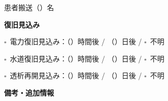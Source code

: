 \documentclass[a4paper,12pt]{jarticle}
\newcommand{\checkbox}{$\square$\ }
\newcommand{\underlinespace}[1]{\underline{\hspace{#1}}}
\begin{document}
\hspace*{3.5cm}患者搬送（\underlinespace{2cm}）名

\vspace{8mm}

\begin{center}
\textbf{\large 復旧見込み}
\end{center}

\vspace{3mm}

\noindent
\checkbox 電力復旧見込み：（\underlinespace{2cm}）時間後 \quad / \quad （\underlinespace{2cm}）日後 \quad / \quad \checkbox 不明

\vspace{3mm}

\noindent
\checkbox 水道復旧見込み：（\underlinespace{2cm}）時間後 \quad / \quad （\underlinespace{2cm}）日後 \quad / \quad \checkbox 不明

\vspace{3mm}

\noindent
\checkbox 透析再開見込み：（\underlinespace{2cm}）時間後 \quad / \quad （\underlinespace{2cm}）日後 \quad / \quad \checkbox 不明

\vspace{8mm}

\begin{center}
\textbf{\large 備考・追加情報}
\end{center}

\vspace{3mm}

\noindent
\underlinespace{13cm}

\vspace{3mm}

\noindent
\underlinespace{13cm}

\vspace{3mm}

\noindent
\underlinespace{13cm}

\vspace{3mm}

\noindent
\underlinespace{13cm}

\vspace{3mm}

\noindent
\underlinespace{13cm}
\end{document}
